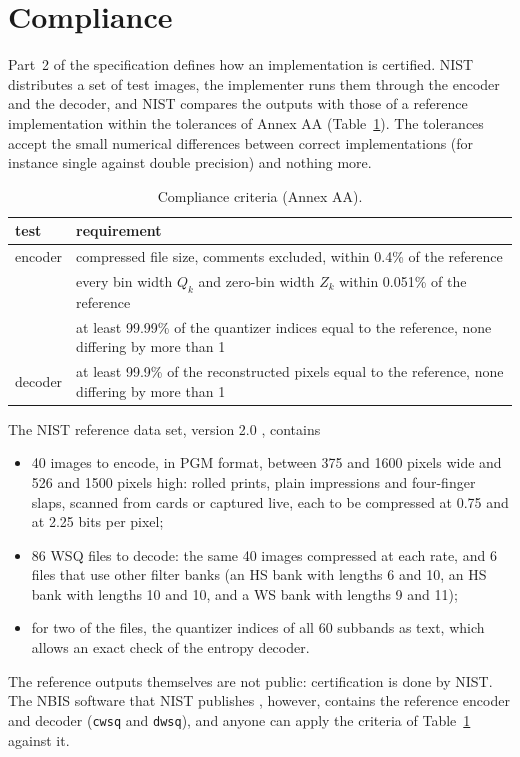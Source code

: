 \section{Compliance}
\label{sec:compliance}

Part~2 of the specification defines how an implementation is certified. NIST distributes a set
of test images, the implementer runs them through the encoder and the decoder, and NIST compares
the outputs with those of a reference implementation within the tolerances of Annex AA
(Table~\ref{tab:criteria}). The tolerances accept the small numerical differences between
correct implementations (for instance single against double precision) and nothing more.

\begin{table}[ht]
  \centering\small
  \begin{tabular}{@{}lp{10.6cm}@{}}
    \toprule
    test & requirement \\
    \midrule
    encoder & compressed file size, comments excluded, within 0.4\% of the reference \\
            & every bin width $Q_k$ and zero-bin width $Z_k$ within 0.051\% of the reference \\
            & at least 99.99\% of the quantizer indices equal to the reference, none differing by more than 1 \\
    decoder & at least 99.9\% of the reconstructed pixels equal to the reference, none differing by more than 1 \\
    \bottomrule
  \end{tabular}
  \caption{Compliance criteria (Annex AA).}
  \label{tab:criteria}
\end{table}

The NIST reference data set, version 2.0 \cite{nistcert}, contains
\begin{itemize}
  \item 40 images to encode, in PGM format, between 375 and 1600 pixels wide and 526 and 1500
        pixels high: rolled prints, plain impressions and four-finger slaps, scanned from cards
        or captured live, each to be compressed at 0.75 and at 2.25 bits per pixel;
  \item 86 WSQ files to decode: the same 40 images compressed at each rate, and 6 files that
        use other filter banks (an HS bank with lengths 6 and 10, an HS bank with lengths 10 and 10,
        and a WS bank with lengths 9 and 11);
  \item for two of the files, the quantizer indices of all 60 subbands as text, which allows an
        exact check of the entropy decoder.
\end{itemize}
The reference outputs themselves are not public: certification is done by NIST. The NBIS
software that NIST publishes \cite{nbis}, however, contains the reference encoder and decoder (\texttt{cwsq}
and \texttt{dwsq}), and anyone can apply the criteria of Table~\ref{tab:criteria} against it.

